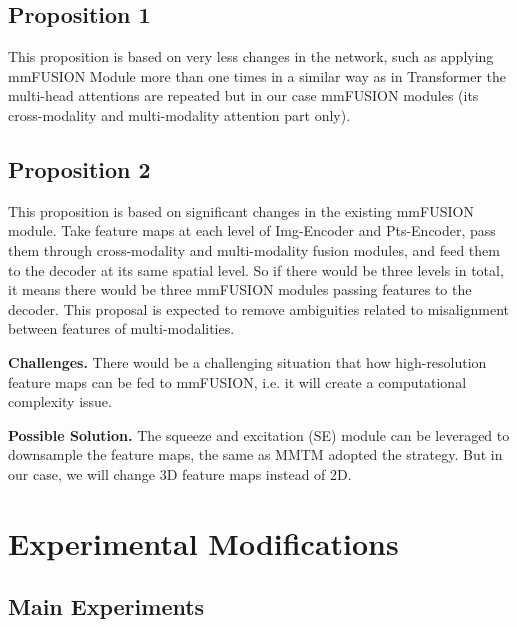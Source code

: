 \documentclass[10pt,twocolumn,letterpaper]{article}
\begin{document}
\subsection{Proposition 1}
This proposition is based on very less changes in the network, such as applying mmFUSION Module more than one times in a similar way as in Transformer the multi-head attentions are repeated but in our case mmFUSION modules (its cross-modality and multi-modality attention part only).

\subsection{Proposition 2}
This proposition is based on significant changes in the existing mmFUSION module. Take feature maps at each level of Img-Encoder and Pts-Encoder, pass them through cross-modality and multi-modality fusion modules, and feed them to the decoder at its same spatial level. So if there would be three levels in total, it means there would be three mmFUSION modules passing features to the decoder. This proposal is expected to remove ambiguities related to misalignment between features of multi-modalities. 

\textbf{Challenges.}
There would be a challenging situation that how high-resolution feature maps can be fed to mmFUSION, i.e. it will create a computational complexity issue. 

\textbf{Possible Solution.}
The squeeze and excitation (SE) module \cite{hu2018squeeze} can be leveraged to downsample the feature maps, the same as MMTM \cite{joze2020mmtm} adopted the strategy. But in our case, we will change 3D feature maps instead of 2D.


\section{Experimental Modifications}
\subsection{Main Experiments}
\end{document}
